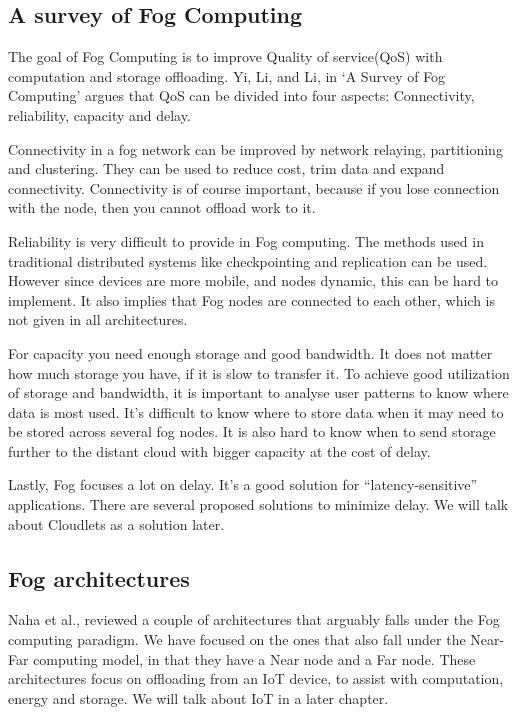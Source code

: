 \subsection{A survey of Fog Computing} %
The goal of Fog Computing is to improve Quality of service(QoS) with computation and storage offloading. Yi, Li, and Li, in ‘A Survey of Fog Computing’\cite{yi_survey_2015} argues that QoS can be divided into four aspects: Connectivity, reliability, capacity and delay.

Connectivity in a fog network can be improved by network relaying, partitioning and clustering. They can be used to reduce cost, trim data and expand connectivity. Connectivity is of course important, because if you lose connection with the node, then you cannot offload work to it. 

Reliability is very difficult to provide in Fog computing. The methods used in traditional distributed systems like checkpointing and replication can be used. However since devices are more mobile, and nodes dynamic, this can be hard to implement. It also implies that Fog nodes are connected to each other, which is not given in all architectures. 

For capacity you need enough storage and good bandwidth. It does not matter how much storage you have, if it is slow to transfer it. To achieve good utilization of storage and bandwidth, it is important to analyse user patterns to know where data is most used. It’s difficult to know where to store data when it may need to be stored across several fog nodes. It is also hard to know when to send storage further to the distant cloud with bigger capacity at the cost of delay. 

Lastly, Fog focuses a lot on delay. It’s a good solution for “latency-sensitive” applications. There are several proposed solutions to minimize delay. We will talk about Cloudlets as a solution later.

\subsection{Fog architectures} %
Naha et al.\cite{naha_fog_2018}, reviewed a couple of architectures that arguably falls under the Fog computing paradigm. We have focused on the ones that also fall under the Near-Far computing model, in that they have a Near node and a Far node. These architectures focus on offloading from an IoT device, to assist with computation, energy and storage. We will talk about IoT in a later chapter. 

